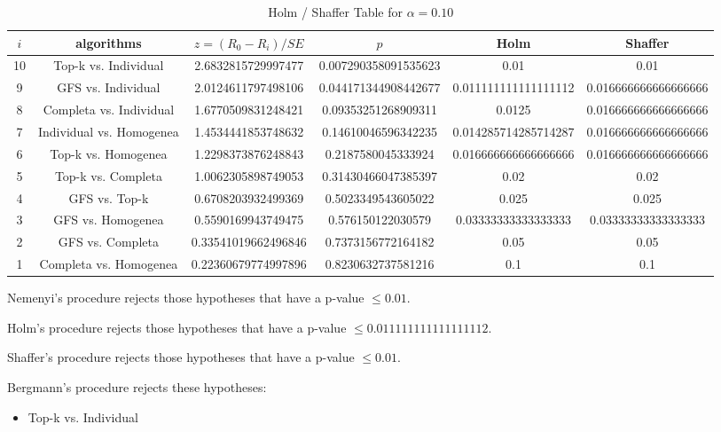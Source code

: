 \documentclass[a4paper,10pt]{article}
\begin{document}
\begin{landscape}
\begin{table}[!htp]
\centering\tiny
\caption{Holm / Shaffer Table for $\alpha=0.10$}
\begin{tabular}{cccccc}
$i$&algorithms&$z=(R_0 - R_i)/SE$&$p$&Holm&Shaffer\\
\hline
10&Top-k vs. Individual&2.6832815729997477&0.007290358091535623&0.01&0.01\\
9&GFS vs. Individual&2.0124611797498106&0.044171344908442677&0.011111111111111112&0.016666666666666666\\
8&Completa vs. Individual&1.6770509831248421&0.09353251268909311&0.0125&0.016666666666666666\\
7&Individual vs. Homogenea&1.4534441853748632&0.14610046596342235&0.014285714285714287&0.016666666666666666\\
6&Top-k vs. Homogenea&1.2298373876248843&0.2187580045333924&0.016666666666666666&0.016666666666666666\\
5&Top-k vs. Completa&1.0062305898749053&0.31430466047385397&0.02&0.02\\
4&GFS vs. Top-k&0.6708203932499369&0.5023349543605022&0.025&0.025\\
3&GFS vs. Homogenea&0.5590169943749475&0.576150122030579&0.03333333333333333&0.03333333333333333\\
2&GFS vs. Completa&0.33541019662496846&0.7373156772164182&0.05&0.05\\
1&Completa vs. Homogenea&0.22360679774997896&0.8230632737581216&0.1&0.1\\
\hline
\end{tabular}
\end{table}
Nemenyi's procedure rejects those hypotheses that have a p-value $\le0.01$.


Holm's procedure rejects those hypotheses that have a p-value $\le0.011111111111111112$.


Shaffer's procedure rejects those hypotheses that have a p-value $\le0.01$.


Bergmann's procedure rejects these hypotheses:


\begin{itemize}


\item Top-k vs. Individual
\end{itemize}



\end{landscape}
\end{document}
